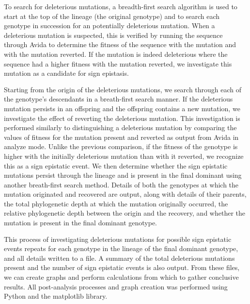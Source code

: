 \documentclass[a4paper, 10pt]{article}
\begin{document}
To search for deleterious mutations, a breadth-first search algorithm is used to start at the top of the lineage (the original genotype) and to search each genotype in succession for an potentially deleterious mutation. When a deleterious mutation is suspected, this is verified by running the sequence through Avida to determine the fitness of the sequence with the mutation and with the mutation reverted. If the mutation is indeed deleterious where the sequence had a higher fitness with the mutation reverted, we investigate this mutation as a candidate for sign epistasis. 

Starting from the origin of the deleterious mutations, we search through each of the genotype's descendants in a breath-first search manner. If the deleterious mutation persists in an offspring and the offspring contains a new mutation, we investigate the effect of reverting the deleterious mutation. This investigation is performed similarly to distinguishing a deleterious mutation by comparing the values of fitness for the mutation present and reverted as output from Avida in analyze mode. Unlike the previous comparison, if the fitness of the genotype is higher with the initially deleterious mutation than with it reverted, we recognize this as a sign epistatic event. We then determine whether the sign epistatic mutations persist through the lineage and is present in the final dominant using another breath-first search method. Details of both the genotypes at which the mutation originated and recovered are output, along with details of their parents, the total phylogenetic depth at which the mutation originally occurred, the relative phylogenetic depth between the origin and the recovery, and whether the mutation is present in the final dominant genotype. 

This process of investigating deleterious mutations for possible sign epistatic events repeats for each genotype in the lineage of the final dominant genotype, and all details written to a file. A summary of the total deleterious mutations present and the number of sign epistatic events is also output. From these files, we can create graphs and perform calculations from which to gather conclusive results. All post-analysis processes and graph creation was performed using Python and the matplotlib library.

\end{document}
